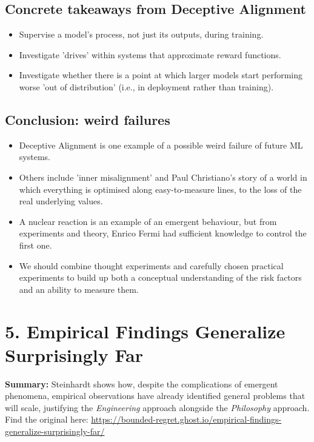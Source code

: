 \documentclass{article}
\begin{document}
\begin{multicols}{2}
\subsection*{Concrete takeaways from Deceptive Alignment}
\begin{itemize}
    \item Supervise a model's process, not just its outputs, during training.
    \item Investigate 'drives' within systems that approximate reward functions.
    \item Investigate whether there is a point at which larger models start performing worse 'out of distribution' (i.e., in deployment rather than training).
\end{itemize}

\subsection*{Conclusion: weird failures}
\begin{itemize}
    \item Deceptive Alignment is one example of a possible weird failure of future ML systems.
    \item Others include 'inner misalignment' and Paul Christiano's story of a world in which everything is optimised along easy-to-measure lines, to the loss of the real underlying values.
    \item A nuclear reaction is an example of an emergent behaviour, but from experiments and theory, Enrico Fermi had sufficient knowledge to control the first one.
    \item We should combine thought experiments and carefully chosen practical experiments to build up both a conceptual understanding of the risk factors and an ability to measure them.
\end{itemize} 

\section*{5. Empirical Findings Generalize Surprisingly Far}
\textbf{Summary:} Steinhardt shows how, despite the complications of emergent phenomena, empirical observations have already identified general problems that will scale, justifying the \textit{Engineering} approach alongside the \textit{Philosophy} approach. \\ Find the original here: \href{https://bounded-regret.ghost.io/empirical-findings-generalize-surprisingly-far/}{https://bounded-regret.ghost.io/empirical-findings-generalize-surprisingly-far/}


\end{multicols}
\end{document}
